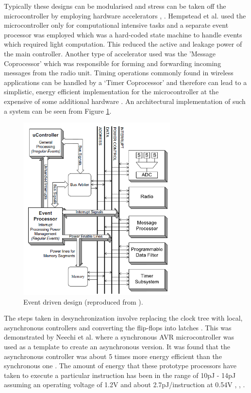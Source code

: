 \documentclass[journal]{IEEEtran}
\begin{document}
Typically these designs can be modularised and stress can be taken off the microcontroller by employing hardware accelerators \cite{SNAP/LE}, \cite{LowPower2005}. Hempstead et al. \cite{LowPower2005} used the microcontroller only for computational intensive tasks and a separate event processor was employed which was a hard-coded state machine to handle events which required light computation. This reduced the active and leakage power of the main controller. Another type of accelerator used was the 'Message Coprocessor' which was responsible for forming and forwarding incoming messages from the radio unit. Timing operations commonly found in wireless applications can be handled by a `Timer Coprocessor' and therefore can lead to a simplistic, energy efficient implementation for the microcontroller at the expensive of some additional hardware \cite{LowPower2005}. An architectural implementation of such a system can be seen from Figure \ref{Figure:Async}. \\
	
	\begin{figure}[h]
	   \centering
	   \includegraphics[width = 8cm]{Async}
	   \caption{Event driven design (reproduced from \cite{LowPower2005}).}
	   \label{Figure:Async}
	\end{figure}	
	\FloatBarrier
	
The steps taken in desynchronization involve replacing the clock tree with local, asynchronous controllers and converting the flip-flops into latches \cite{AVR}. This was demonstrated by Neechi et al. \cite{AVR} where a synchronous AVR microcontroller was used as a template to create an asynchronous version. It was found that the asynchronous controller was about 5 times more energy efficient than the synchronous one \cite{AVR}. The amount of energy that these prototype processors have taken to execute a particular instruction has been in the range of 10pJ - 14pJ assuming an operating voltage of 1.2V and about 2.7pJ/instruction at 0.54V \cite{SNAP/LE}, \cite{AVR}, \cite{SmartDust}.
	 
\end{document}
